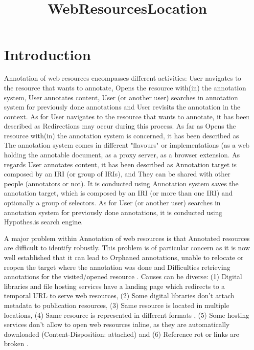 \documentclass{article}
\title{WebResourcesLocation}
\author{}
\begin{document}
\maketitle
      

\section{Introduction}

Annotation of web resources encompasses different activities: User navigates to the resource that wants to annotate, Opens the resource with(in) the annotation system, User annotates content, User (or another user) searches in annotation system for previously done annotations and User revisits the annotation in the context. As for User navigates to the resource that wants to annotate, it has been described as Redirections may occur during this process. As far as Opens the resource with(in) the annotation system is concerned, it has been described as The annotation system comes in different "flavours" or implementations (as a web holding the annotable document, as a proxy server, as a browser extension. As regards User annotates content, it has been described as Annotation target is composed by an IRI (or group of IRIs), and They can be shared with other people (annotators or not). It is conducted using Annotation system saves the annotation target, which is composed by an IRI (or more than one IRI) and optionally a group of selectors. As for User (or another user) searches in annotation system for previously done annotations, it is conducted using Hypothes.is search engine. 
    
A major problem within Annotation of web resources is that Annotated resources are difficult to identify robustly. This problem is of particular concern as it is now well established that it can lead to Orphaned annotations, unable to relocate or reopen the target where the annotation was done \cite{Aturban2015} \cite{Aturban2015} and Difficulties retrieving annotations for the visited/opened resource \cite{Klein2018}. Causes can be diverse: (1) Digital libraries and file hosting services have a landing page which redirects to a temporal URL to serve web resources, (2) Some digital libraries don't attach metadata to publication resources, (3) Same resource is located in multiple locations, (4) Same resource is represented in different formats \cite{Van de Sompel2016} \cite{Van de Sompel2016} \cite{Van de Sompel2016}, (5) Some hosting services don't allow to open web resources inline, as they are automatically downloaded (Content-Disposition: attached) and (6) Reference rot or links are broken \cite{Klein2014} \cite{Klein2014}. 
    
\end{document}
